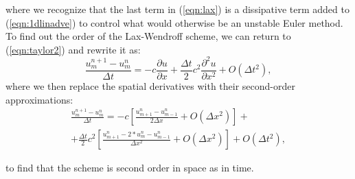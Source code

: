 \documentclass[11pt, oneside]{article}   	%
\begin{document}
where we recognize that the last term in (\ref{eqn:lax}) is a dissipative term added to (\ref{eqn:1dlinadve}) to control what would otherwise be an unstable Euler method. 
To find out the order of the Lax-Wendroff scheme, we can return to (\ref{eqn:taylor2}) and rewrite it as:
\begin{equation*}\label{eqn:taylor3}
   \frac{u_{m}^{n+1} - u_{m}^{n}}{ \Delta t } =-c\frac{\partial u}{\partial x} + \frac{\Delta t}{2} c^{2}\frac{\partial^2 u}{\partial x^2}+O(\Delta t^2),
\end{equation*} 
where we then replace the spatial derivatives with their second-order approximations:
\begin{multline*}\label{eqn:taylor4}
   \frac{u_{m}^{n+1} - u_{m}^{n}}{ \Delta t } =-c \left[ \frac{u_{m+1}^{n}-u_{m-1}^{n}}{2\Delta x}   + O(\Delta x^2)\right] + \\
  +\frac{\Delta t}{2} c^{2}\left[ \frac{u_{m+1}^{n}-2*u_{m}^{n} - u_{m-1}^{n}}{\Delta x^2}  + O(\Delta x^2)\right]+O(\Delta t^2),
\end{multline*} 

to find that the scheme is second order in space as in time.
\end{document}
